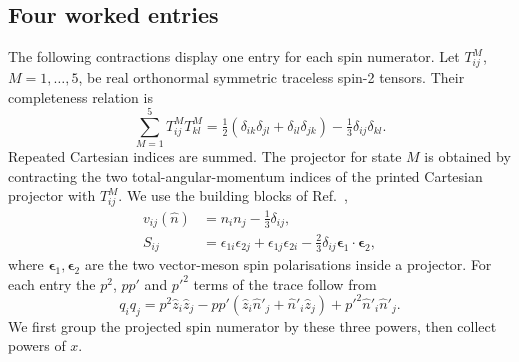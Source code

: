 \subsection{Four worked entries}

The following contractions display one entry for each spin numerator.
Let $T^M_{ij}$, $M=1,\ldots,5$, be real orthonormal symmetric traceless
spin-2 tensors. Their completeness relation is
\begin{equation}
 \sum_{M=1}^5 T^M_{ij}T^M_{kl}
 =\tfrac12(\delta_{ik}\delta_{jl}+\delta_{il}\delta_{jk})
 -\tfrac13\delta_{ij}\delta_{kl}.
\label{eq:spin2-completeness}
\end{equation}
Repeated Cartesian indices are summed. The projector for state $M$ is
obtained by contracting the two total-angular-momentum indices of the
printed Cartesian projector with $T^M_{ij}$. We use the building blocks
of Ref.~\cite{Baru:2019xnh},
\begin{align}
 v_{ij}(\hat n)&=n_in_j-\tfrac13\delta_{ij},\\
 S_{ij}&=\epsilon_{1i}\epsilon_{2j}+\epsilon_{1j}\epsilon_{2i}
 -\tfrac23\delta_{ij}\bm\epsilon_1\cdot\bm\epsilon_2,
\end{align}
where $\bm\epsilon_1,\bm\epsilon_2$ are the two vector-meson spin
polarisations inside a projector. For each entry the $p^2$, $pp'$ and
$p'^2$ terms of the trace follow from
\begin{equation}
 q_iq_j=p^2\hat z_i\hat z_j
 -pp'(\hat z_i\hat n'_j+\hat n'_i\hat z_j)
 +p'^2\hat n'_i\hat n'_j.
\end{equation}
We first group the projected spin numerator by these three powers,
then collect powers of $x$.

